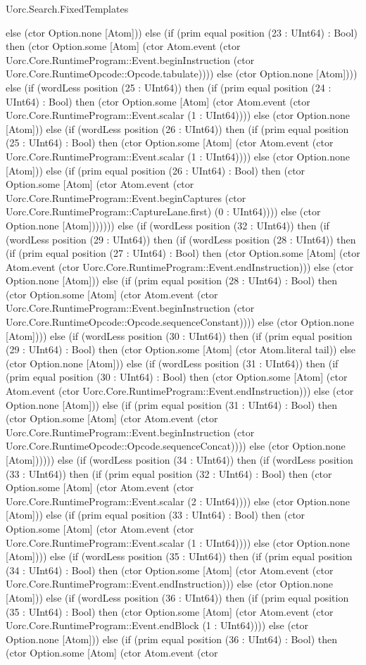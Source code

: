 \begin{lexlean}{Uorc.Search.FixedTemplates}
\begin{semanticmodule}
{else (ctor Option.none [Atom])) else (if (prim equal position (23 : UInt64) : Bool) then (ctor Option.some [Atom] (ctor Atom.event (ctor Uorc.Core.RuntimeProgram::Event.beginInstruction (ctor Uorc.Core.RuntimeOpcode::Opcode.tabulate)))) else (ctor Option.none [Atom]))) else (if (wordLess position (25 : UInt64)) then (if (prim equal position (24 : UInt64) : Bool) then (ctor Option.some [Atom] (ctor Atom.event (ctor Uorc.Core.RuntimeProgram::Event.scalar (1 : UInt64)))) else (ctor Option.none [Atom])) else (if (wordLess position (26 : UInt64)) then (if (prim equal position (25 : UInt64) : Bool) then (ctor Option.some [Atom] (ctor Atom.event (ctor Uorc.Core.RuntimeProgram::Event.scalar (1 : UInt64)))) else (ctor Option.none [Atom])) else (if (prim equal position (26 : UInt64) : Bool) then (ctor Option.some [Atom] (ctor Atom.event (ctor Uorc.Core.RuntimeProgram::Event.beginCaptures (ctor Uorc.Core.RuntimeProgram::CaptureLane.first) (0 : UInt64)))) else (ctor Option.none [Atom])))))) else (if (wordLess position (32 : UInt64)) then (if (wordLess position (29 : UInt64)) then (if (wordLess position (28 : UInt64)) then (if (prim equal position (27 : UInt64) : Bool) then (ctor Option.some [Atom] (ctor Atom.event (ctor Uorc.Core.RuntimeProgram::Event.endInstruction))) else (ctor Option.none [Atom])) else (if (prim equal position (28 : UInt64) : Bool) then (ctor Option.some [Atom] (ctor Atom.event (ctor Uorc.Core.RuntimeProgram::Event.beginInstruction (ctor Uorc.Core.RuntimeOpcode::Opcode.sequenceConstant)))) else (ctor Option.none [Atom]))) else (if (wordLess position (30 : UInt64)) then (if (prim equal position (29 : UInt64) : Bool) then (ctor Option.some [Atom] (ctor Atom.literal tail)) else (ctor Option.none [Atom])) else (if (wordLess position (31 : UInt64)) then (if (prim equal position (30 : UInt64) : Bool) then (ctor Option.some [Atom] (ctor Atom.event (ctor Uorc.Core.RuntimeProgram::Event.endInstruction))) else (ctor Option.none [Atom])) else (if (prim equal position (31 : UInt64) : Bool) then (ctor Option.some [Atom] (ctor Atom.event (ctor Uorc.Core.RuntimeProgram::Event.beginInstruction (ctor Uorc.Core.RuntimeOpcode::Opcode.sequenceConcat)))) else (ctor Option.none [Atom]))))) else (if (wordLess position (34 : UInt64)) then (if (wordLess position (33 : UInt64)) then (if (prim equal position (32 : UInt64) : Bool) then (ctor Option.some [Atom] (ctor Atom.event (ctor Uorc.Core.RuntimeProgram::Event.scalar (2 : UInt64)))) else (ctor Option.none [Atom])) else (if (prim equal position (33 : UInt64) : Bool) then (ctor Option.some [Atom] (ctor Atom.event (ctor Uorc.Core.RuntimeProgram::Event.scalar (1 : UInt64)))) else (ctor Option.none [Atom]))) else (if (wordLess position (35 : UInt64)) then (if (prim equal position (34 : UInt64) : Bool) then (ctor Option.some [Atom] (ctor Atom.event (ctor Uorc.Core.RuntimeProgram::Event.endInstruction))) else (ctor Option.none [Atom])) else (if (wordLess position (36 : UInt64)) then (if (prim equal position (35 : UInt64) : Bool) then (ctor Option.some [Atom] (ctor Atom.event (ctor Uorc.Core.RuntimeProgram::Event.endBlock (1 : UInt64)))) else (ctor Option.none [Atom])) else (if (prim equal position (36 : UInt64) : Bool) then (ctor Option.some [Atom] (ctor Atom.event (ctor }
\end{semanticmodule}
\end{lexlean}
